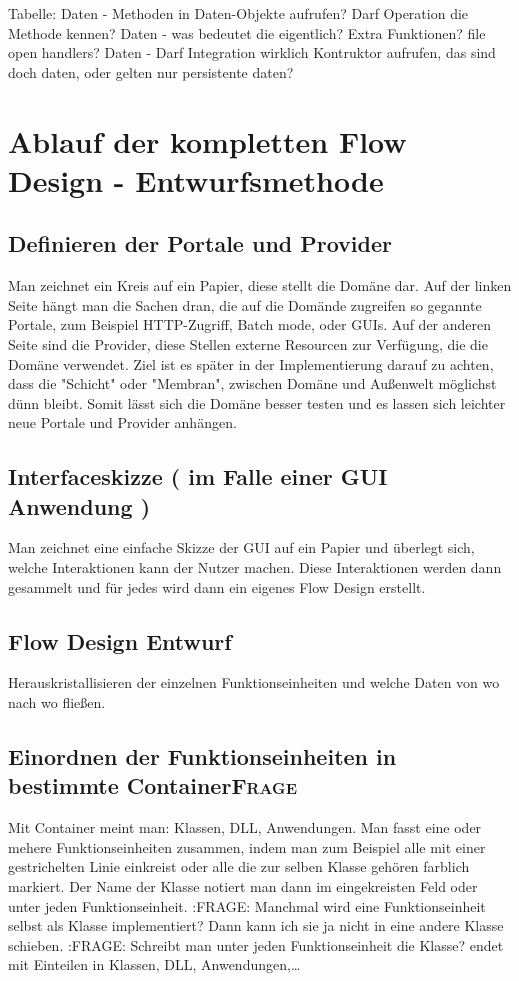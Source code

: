 \documentclass[11pt]{article}
\begin{document}
Tabelle:
Daten - Methoden in Daten-Objekte aufrufen? Darf Operation die Methode kennen?
Daten - was bedeutet die eigentlich? Extra Funktionen? file open handlers?
Daten - Darf Integration wirklich Kontruktor aufrufen, das sind doch daten, oder gelten nur persistente daten?



\section{Ablauf der kompletten Flow Design - Entwurfsmethode}
\label{sec:orgheadline49}

\subsection{Definieren der Portale und Provider}
\label{sec:orgheadline45}
    Man zeichnet ein Kreis auf ein Papier, diese stellt die Domäne dar.
    Auf der linken Seite hängt man die Sachen dran, die auf die Domände zugreifen so gegannte Portale, zum Beispiel HTTP-Zugriff,
    Batch mode, oder GUIs.
    Auf der anderen Seite sind die Provider, diese Stellen externe Resourcen zur Verfügung, die die Domäne verwendet.
    Ziel ist es später in der Implementierung darauf zu achten, dass die "Schicht" oder "Membran", zwischen Domäne und Außenwelt möglichst
dünn bleibt. Somit lässt sich die Domäne besser testen und es lassen sich leichter neue Portale und Provider anhängen.

\subsection{Interfaceskizze ( im Falle einer GUI Anwendung )}
\label{sec:orgheadline46}
Man zeichnet eine einfache Skizze der GUI auf ein Papier und überlegt sich, welche Interaktionen kann der Nutzer machen.
Diese Interaktionen werden dann gesammelt und für jedes wird dann ein eigenes Flow Design erstellt.

\subsection{Flow Design Entwurf}
\label{sec:orgheadline47}
Herauskristallisieren der einzelnen Funktionseinheiten und welche Daten von wo nach wo fließen.

\subsection{Einordnen der Funktionseinheiten in bestimmte Container\hfill{}\textsc{Frage}}
\label{sec:orgheadline48}
Mit Container meint man: Klassen, DLL, Anwendungen.
Man fasst eine oder mehere Funktionseinheiten zusammen, indem man zum Beispiel alle mit einer gestrichelten Linie einkreist oder alle die zur selben Klasse
gehören farblich markiert. Der Name der Klasse notiert man dann im eingekreisten Feld oder unter jeden Funktionseinheit.
:FRAGE: Manchmal wird eine Funktionseinheit selbst als Klasse implementiert? Dann kann ich sie ja nicht in eine andere Klasse schieben.
:FRAGE: Schreibt man unter jeden Funktionseinheit die Klasse?
  endet mit Einteilen in Klassen, DLL, Anwendungen,\ldots{}
\end{document}
